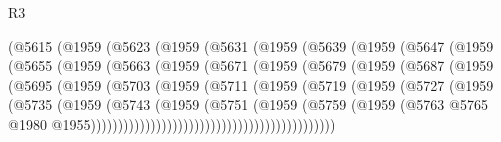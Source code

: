 \begin{lexlean}{R3}
\begin{coremodule}
                (@5615
                  (@1959
                    (@5623
                      (@1959
                        (@5631
                          (@1959
                            (@5639
                              (@1959
                                (@5647
                                  (@1959
                                    (@5655
                                      (@1959
                                        (@5663
                                          (@1959
                                            (@5671
                                              (@1959
                                                (@5679
                                                  (@1959
                                                    (@5687
                                                      (@1959
                                                        (@5695
                                                          (@1959
                                                            (@5703
                                                              (@1959
                                                                (@5711
                                                                  (@1959
                                                                    (@5719
                                                                      (@1959
                                                                        (@5727
                                                                          (@1959
                                                                            (@5735
                                                                              (@1959
                                                                                (@5743
                                                                                  (@1959
                                                                                    (@5751
                                                                                      (@1959
                                                                                        (@5759
                                                                                          (@1959
                                                                                            (@5763
                                                                                              @5765
                                                                                              @1980
                                                                                              @1955)))))))))))))))))))))))))))))))))))))))))))))

\end{coremodule}
\end{lexlean}
